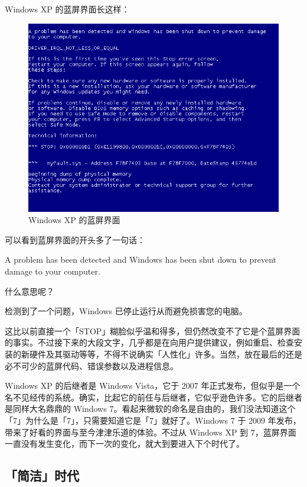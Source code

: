 Windows XP 的蓝屏界面长这样：

\begin{figure}[htb!]
  \centering
  \includegraphics[width=.7\textwidth]{assets/advanced/Win-XP-BSoD.png}
  \caption{Windows XP 的蓝屏界面}
  \label{fig:Win-XP-BSoD}
\end{figure}

可以看到蓝屏界面的开头多了一句话：

\begin{quoting}
  A problem has been detected and Windows has been shut down to prevent damage to your computer.
\end{quoting}

什么意思呢？

\begin{quoting}
  检测到了一个问题，Windows 已停止运行从而避免损害您的电脑。
\end{quoting}

这比以前直接一个「STOP」糊脸似乎温和得多，但仍然改变不了它是个蓝屏界面的事实。不过接下来的大段文字，几乎都是在向用户提供建议，例如重启、检查安装的新硬件及其驱动等等，不得不说确实「人性化」许多。当然，放在最后的还是必不可少的蓝屏代码、错误参数以及进程信息。

Windows XP 的后继者是 Windows Vista，它于 2007 年正式发布，但似乎是一个名不见经传的系统。确实，比起它的前任与后继者，它似乎逊色许多。它的后继者是同样大名鼎鼎的 Windows 7。看起来微软的命名是自由的，我们没法知道这个「7」为什么是「7」，只需要知道它是「7」就好了。Windows 7 于 2009 年发布，带来了好看的界面与至今津津乐道的体验。不过从 Windows XP 到 7，蓝屏界面一直没有发生变化，而下一次的变化，就大到要进入下个时代了。

\subsection{「简洁」时代}

